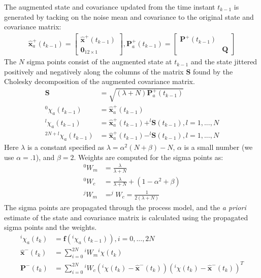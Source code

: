 \documentclass[letterpaper]{article}
\newcommand{\bb}[1]{\mathbf{#1}}
\begin{document}
The augmented state and covariance updated from the time instant
$t_{k-1}$ is generated by tacking on the noise mean and covariance to
the original state and covariance matrix:
\begin{align}
\bb{\hat{x}}_a^+(t_{k-1})=\begin{bmatrix}\bb{\hat{x}}^+(t_{k-1}) \\ \bb{0}_{12 \times 1}\end{bmatrix}, \bb{P}_a^+(t_{k-1})=\begin{bmatrix} \bb{P}^+(t_{k-1}) & \\  & \bb{Q} \end{bmatrix}
\end{align}
The $N$ sigma points consist of the augmented state at $t_{k-1}$ and
the state jittered positively and negatively along the columns of the
matrix $\bb{S}$ found by the Cholesky decomposition of the augmented
covariance matrix.
\begin{align}
\bb{S} &=\sqrt{(\lambda+N) \bb{P}_a^+(t_{k-1})} \\
^0\chi_a(t_{k-1})&=\bb{\hat{x}}_a^+(t_{k-1}) \nonumber\\
^l\chi_a(t_{k-1})&=\bb{\hat{x}}_a^+(t_{k-1}) + ^l\bb{S}(t_{k-1}), l={1,...,N} \nonumber\\
^{2N+l}\chi_a(t_{k-1})&=\bb{\hat{x}}_a^+(t_{k-1})- ^l\bb{S}(t_{k-1}), l={1,...,N} \nonumber
\label{eq_sigmapoints}
\end{align}
Here $\lambda$ is a constant specified as
$\lambda=\alpha^2(N+\beta)-N$, $\alpha$ is a small number (we use
$\alpha=.1$), and $\beta=2$. Weights are computed for the sigma points
as:
\begin{align}
^0W_m&=\frac{\lambda}{\lambda+N} \\
^0W_c&=\frac{\lambda}{\lambda+N}+\left(1-\alpha^2+\beta\right) \nonumber\\
^jW_m&=^jW_c=\frac{1}{2(\lambda+N)} \nonumber
\end{align}
The sigma points are propagated through the process model, and the
\emph{a priori} estimate of the state and covariance matrix is
calculated using the propagated sigma points and the weights.
\begin{align}
^i\chi_a(t_k)&=\bb{f}(^i\chi_a(t_{k-1})), i=0,...,2N \\
\bb{\hat{x}}^-(t_k)&=\sum_{i=0}^{2N} \text{} ^iW_m \text{}^i\chi(t_k) \nonumber\\
\bb{P}^-(t_k)&=\sum_{i=0}^{2N} \text{} ^iW_c \left( ^i\chi(t_k)-\bb{\hat{x}}^-(t_k)\right) \left( ^i\chi(t_k)-\bb{\hat{x}}^-(t_k)\right)^T \nonumber
\end{align}
\end{document}
